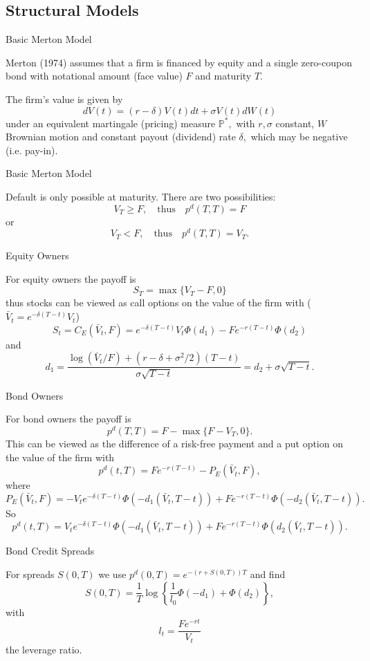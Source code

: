 \subsection{Structural Models}

{Basic Merton Model}

Merton (1974)
assumes that a firm is financed by
equity and a single zero-coupon bond with notational amount (face
value) $F$ and maturity $T$.

The firm's value is given by
$$
dV(t) = (r-\delta) V(t)  dt + \sigma V(t) dW(t)
$$
under an equivalent martingale (pricing) measure $\mathbb{P^*},$ with $r,
\sigma$ constant, $W$ Brownian motion and constant payout
(dividend) rate $\delta,$ which may be negative (i.e. pay-in).



{Basic Merton Model}

Default is only possible at maturity. There are two possibilities:
$$
V_T \geq F, \quad \mbox{thus} \quad p^d(T,T)=F
$$
or
$$
V_T < F, \quad \mbox{thus} \quad p^d(T,T)=V_T.
$$


{Equity Owners}

For equity owners the payoff  is
$$
S_T=\max\{V_T-F,0\}
$$
thus stocks can be viewed as call options on the value of the firm
with ($\bar{V}_t = e^{-\delta(T-t)}V_t$)
$$
S_t=C_E(\bar{V}_t,F)=e^{-\delta(T-t)}V_t\Phi(d_1)-Fe^{-r(T-t)}\Phi(d_2)
$$
and
$$
d_1=\frac{\log(\bar{V}_t/F)+(r-\delta+\sigma^2/2)(T-t)}{\sigma\sqrt{T-t}}=d_2+\sigma\sqrt{T-t}.
$$


{Bond Owners}

For bond owners the payoff is
$$
p^d(T,T)=F-\max\{F-V_T,0\}.
$$
This can be viewed as the difference
of a risk-free payment and a put option on the value of the firm
with
$$
p^d(t,T)=Fe^{-r(T-t)}-P_E(\bar{V}_t,F),
$$
where
$$
P_E(\bar{V}_t,F)=-V_t e^{-\delta(T-t)}
\Phi(-d_1(\bar{V}_t,T-t))+Fe^{-r(T-t)}\Phi(-d_2(\bar{V}_t,T-t)).
$$
So
$$
p^d(t,T)= V_t e^{-\delta(T-t)} \Phi(-d_1(\bar{V}_t,T-t))+
Fe^{-r(T-t)}\Phi(d_2(\bar{V}_t,T-t)).
$$





{Bond Credit Spreads}

For spreads  $S(0,T)$ we use $p^d(0,T)=e^{-(r+S(0,T))T}$ and
find
$$
S(0,T)=\frac{1}{T}\log\left\{\frac{1}{l_0}\Phi(-d_1)+\Phi(d_2)\right\},
$$
with
$$
l_t=\frac{F e^{-rt}}{V_t}
$$
the leverage ratio.



